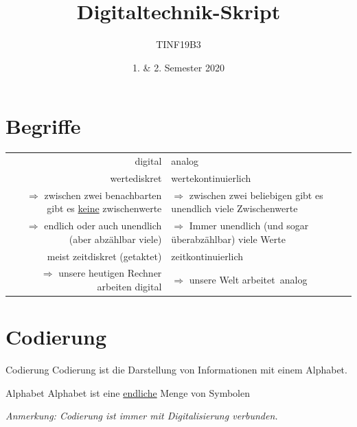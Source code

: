 \documentclass[10pt,a4paper]{scrartcl}
\author{TINF19B3}
\date{1. \& 2. Semester 2020}
\title{Digitaltechnik-Skript}
\begin{document}
\restoregeometry %
\nopagecolor%


	\newpage
	\tableofcontents
	\newpage
	\section{Begriffe}
	\begin{tabular}{r|l}
		digital & analog \\
		wertediskret & wertekontinuierlich\\
		$\Rightarrow$ zwischen zwei benachbarten gibt es \underline{keine} zwischenwerte & $\Rightarrow$ zwischen zwei beliebigen gibt es unendlich viele Zwischenwerte \\
		$ \Rightarrow $ endlich oder auch unendlich (aber abzählbar viele) & $ \Rightarrow $ Immer unendlich (und sogar überabzählbar) viele Werte \\
		meist zeitdiskret (\glqq getaktet\grqq) & zeitkontinuierlich \\
		$ \Rightarrow $ unsere heutigen Rechner arbeiten digital & $ \Rightarrow $ unsere Welt \glqq arbeitet\grqq\ analog
	\end{tabular}

\section{Codierung}

	\begin{Theorem}{Codierung}{}
		Codierung ist die Darstellung von Informationen mit einem \glqq Alphabet\grqq.
	\end{Theorem}
		
	\begin{Theorem}{Alphabet}{}
		Alphabet ist eine \underline{endliche} Menge von Symbolen
	\end{Theorem}
	
	\textit{Anmerkung: Codierung ist immer mit Digitalisierung verbunden.} \\
	
\end{document}
